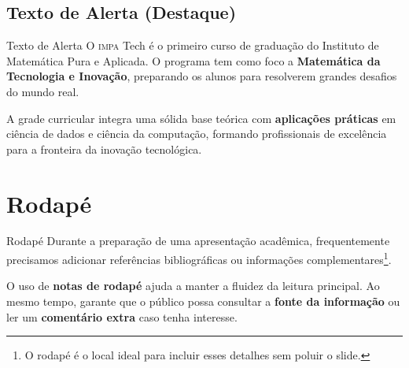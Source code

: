 \documentclass[aspectratio=169]{beamer}
\begin{document}

\subsection{Texto de Alerta (Destaque)}

\begin{frame}{Texto de Alerta}
   O \alert{\textsc{impa} Tech} é o primeiro curso de graduação do Instituto de Matemática Pura e 
   Aplicada. O programa tem como foco a \alert{\textbf{Matemática da Tecnologia e Inovação}}, 
   preparando os alunos para resolverem grandes desafios do mundo real. 

    \vspace{1em}

    A grade curricular integra uma sólida base teórica com \alert{\textbf{aplicações práticas}} 
    em \alert{ciência de dados} e \alert{ciência da computação}, formando profissionais 
    de excelência para a fronteira da inovação tecnológica.
\end{frame}


\section{Rodapé}

\begin{frame}{Rodapé}
    Durante a preparação de uma apresentação acadêmica, frequentemente precisamos 
    adicionar referências bibliográficas ou informações complementares\footnote{O rodapé é o local ideal para incluir esses detalhes sem poluir o slide.}.

    \vspace{1em}

    O uso de \textbf{notas de rodapé} ajuda a manter a fluidez da leitura principal. Ao mesmo 
    tempo, garante que o público possa consultar a \textbf{fonte da informação} ou ler um 
    \textbf{comentário extra} caso tenha interesse.
\end{frame}

\end{document}
